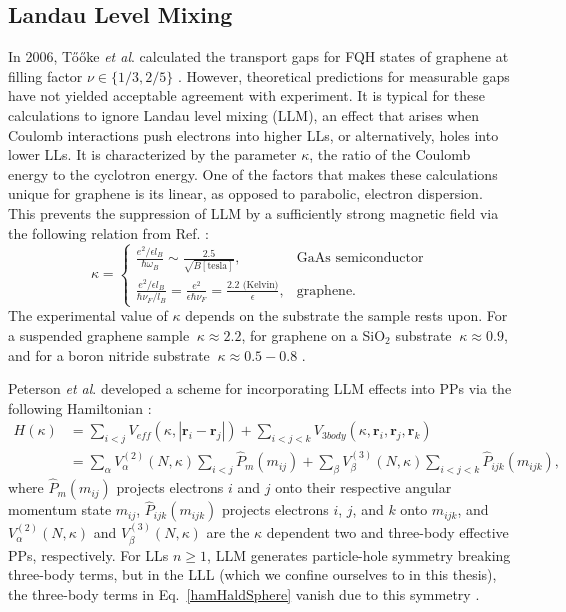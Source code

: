 	\subsection{Landau Level Mixing} \label{ssec:landLevMix}
	    In 2006, T\ifmmode \mbox{\H{o}}\else \H{o}\fi{}ke \textit{et al}. calculated the transport gaps for FQH states of graphene at filling factor $\nu\in\{1/3,2/5\}$ \cite{toke}. However, theoretical predictions for measurable gaps have not yielded acceptable agreement with experiment. It is typical for these calculations to ignore Landau level mixing (LLM), an effect that arises when Coulomb interactions push electrons into higher LLs, or alternatively, holes into lower LLs. It is characterized by the parameter $\kappa$, the ratio of the Coulomb energy to the cyclotron energy. One of the factors that makes these calculations unique for graphene is its linear, as opposed to parabolic, electron dispersion. This prevents the suppression of LLM by a sufficiently strong magnetic field via the following relation from Ref. \cite{peterson2014}:
        \begin{equation} \label{kappGraph}
        \kappa = 
        \begin{cases} 
        \frac{e^2/\epsilon l_B}{\hbar\omega_B} \sim \frac{2.5}{\sqrt{B[\text{tesla}]}}, & \text{GaAs semiconductor} \\
        \frac{e^2/\epsilon l_B}{\hbar\nu_F/l_B} = \frac{e^2}{\epsilon\hbar\nu_F}=\frac{2.2\text{ (Kelvin)}}{\epsilon}, & \text{graphene.}
        \end{cases}
        \end{equation}
        The experimental value of $\kappa$ depends on the substrate the sample rests upon. For a suspended graphene sample $~{\kappa}\approx2.2$, for graphene on a SiO$_2$ substrate $~{\kappa}\approx0.9$, and for a boron nitride substrate $~{\kappa}\approx0.5-0.8$ \cite{peterson}.
	    
	    Peterson \textit{et al}. developed a scheme for incorporating LLM effects into PPs via the following Hamiltonian \cite{peterson2014}:
        \begin{equation} \label{hamHaldSphere}
        \begin{split}
        H(\kappa) & = \sum_{i<j}V_{eff}(\kappa,|\mathbf{r}_i-\mathbf{r}_j|)+\sum_{i<j<k}V_{3body}(\kappa,\mathbf{r}_i,\mathbf{r}_j,\mathbf{r}_k) \\
        & = \sum_\alpha V_\alpha^{(2)}(N,\kappa)\sum_{i<j}\hat{P}_m(m_{ij}) + \sum_\beta V_\beta^{(3)}(N,\kappa)\sum_{i<j<k}\hat{P}_{ijk}(m_{ijk}),
        \end{split}
        \end{equation}
        where $\hat{P}_m(m_{ij})$ projects electrons $i$ and $j$ onto their respective angular momentum state $m_{ij}$, $\hat{P}_{ijk}(m_{ijk})$ projects electrons $i$, $j$, and $k$ onto $m_{ijk}$, and $V_\alpha^{(2)}(N,\kappa)$ and $V_\beta^{(3)}(N,\kappa)$ are the $\kappa$ dependent two and three-body effective PPs, respectively. For LLs $n\ge1$, LLM generates particle-hole symmetry breaking three-body terms, but in the LLL (which we confine ourselves to in this thesis), the three-body terms in Eq.~\ref{hamHaldSphere} vanish due to this symmetry \cite{peterson}. 
        
